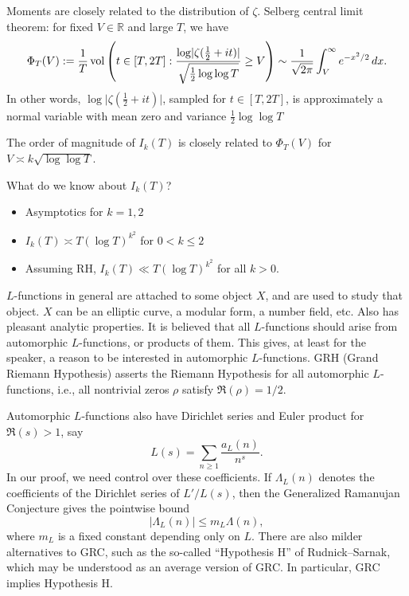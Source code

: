 \documentclass[reqno]{amsart} 
\begin{document}
Moments are closely related to the distribution of $\zeta$.  Selberg central limit theorem: for fixed $V \in \mathbb{R}$ and large $T$, we have
\begin{equation*}
  \Phi_T(V) := \frac{1}{T}
  \operatorname{vol} \left(
    t \in[T, 2 T] :
    \frac{\log \lvert \zeta(\tfrac{1}{2} + i t) \rvert}{ \sqrt{\tfrac{1}{2} \log \log T}} \geq V\right)
  \sim \frac{1}{\sqrt{2 \pi}}
  \int_V^\infty e^{- x^2 /2} \, d x.
\end{equation*}
In other words, $\log \lvert \zeta(\tfrac{1}{2} + i t) \rvert$, sampled for $t \in[T, 2 T]$, is approximately a normal variable with mean zero and variance $\tfrac{1}{2} \log \log T$

The order of magnitude of $I_k(T)$ is closely related to $\Phi_T(V)$ for $V \asymp k \sqrt{\log \log T}$.

What do we know about $I_k(T)$?
\begin{itemize}
\item Asymptotics for $k = 1, 2$
\item $I_k(T) \asymp T (\log T)^{k^2}$ for $0 < k \leq 2$
\item Assuming RH, $I_k(T) \ll T(\log T)^{k^2}$ for all $k > 0$.
\end{itemize}

$L$-functions in general are  attached to some object $X$, and are used to study that object.  $X$ can be an elliptic curve, a modular form, a number field, etc.  Also has pleasant analytic properties.  It is believed that all $L$-functions should arise from automorphic $L$-functions, or products of them.  This gives, at least for the speaker, a reason to be interested in automorphic $L$-functions.  GRH (Grand Riemann Hypothesis) asserts the Riemann Hypothesis for all automorphic $L$-functions, i.e., all nontrivial zeros $\rho$ satisfy $\Re(\rho) = 1/2$.

Automorphic $L$-functions also have Dirichlet series and Euler product for $\Re(s) > 1$, say
\begin{equation*}
  L(s) = \sum_{n \geq 1}
  \frac{a_L(n)}{ n^s}.
\end{equation*}
In our proof, we need control over these coefficients.  If $\Lambda_L(n)$ denotes the coefficients of the Dirichlet series of $L'/L(s)$, then the Generalized Ramanujan Conjecture gives the pointwise bound
\begin{equation*}
  \lvert \Lambda_L(n) \rvert \leq m_L \Lambda(n),
\end{equation*}
where $m_L$ is a fixed constant depending only on $L$.  There are also milder alternatives to GRC, such as the so-called ``Hypothesis H'' of Rudnick--Sarnak, which may be understood as an average version of GRC.  In particular, GRC implies Hypothesis H.
\end{document}
